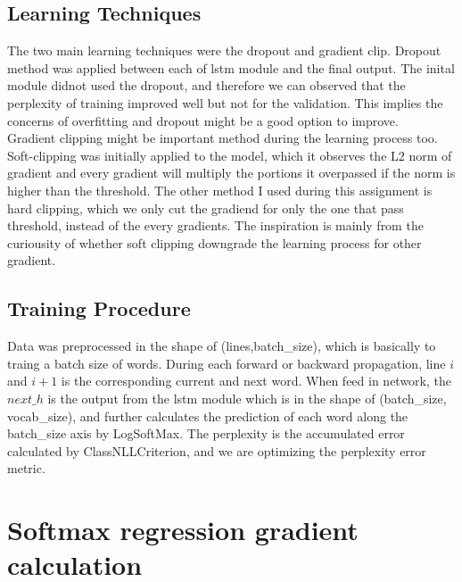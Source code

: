 \documentclass{article}
\begin{document}
\subsection{Learning Techniques}
The two main learning techniques were the dropout and gradient clip. Dropout method was applied between each of lstm module and the final output. The inital module didnot used the dropout, and therefore we can observed that the perplexity of training improved well but not for the validation. This implies the concerns of overfitting and dropout might be a good option to improve.\\
Gradient clipping might be important method during the learning process too. Soft-clipping was initially applied to the model, which it observes the L2 norm of gradient and every gradient will multiply the portions it overpassed if the norm is higher than the threshold. The other method I used during this assignment is hard clipping, which we only cut the gradiend for only the one that pass threshold, instead of the every gradients. The inspiration is mainly from the curiousity of whether soft clipping downgrade the learning process for other gradient.

\subsection{Training Procedure}
Data was preprocessed in the shape of (lines,batch\_size), which is basically to traing a batch size of words. During each forward or backward propagation, line $i$ and $i+1$ is the corresponding current and next word. When feed in network, the $next\_h$ is the output from the lstm module which is in the shape of (batch\_size, vocab\_size), and further calculates the prediction of each word along the batch\_size axis by LogSoftMax. The perplexity is the accumulated error calculated by ClassNLLCriterion, and we are optimizing the perplexity error metric.


\section{Softmax regression gradient calculation}
\end{document}
